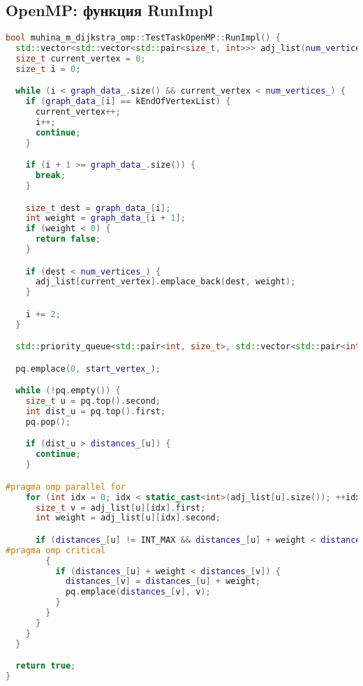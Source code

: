 \documentclass[12pt]{article}
\begin{document}
\subsection*{OpenMP: функция RunImpl}
\begin{lstlisting}[language=C++]
bool muhina_m_dijkstra_omp::TestTaskOpenMP::RunImpl() {
  std::vector<std::vector<std::pair<size_t, int>>> adj_list(num_vertices_);
  size_t current_vertex = 0;
  size_t i = 0;

  while (i < graph_data_.size() && current_vertex < num_vertices_) {
    if (graph_data_[i] == kEndOfVertexList) {
      current_vertex++;
      i++;
      continue;
    }

    if (i + 1 >= graph_data_.size()) {
      break;
    }

    size_t dest = graph_data_[i];
    int weight = graph_data_[i + 1];
    if (weight < 0) {
      return false;
    }

    if (dest < num_vertices_) {
      adj_list[current_vertex].emplace_back(dest, weight);
    }

    i += 2;
  }

  std::priority_queue<std::pair<int, size_t>, std::vector<std::pair<int, size_t>>, std::greater<>> pq;

  pq.emplace(0, start_vertex_);

  while (!pq.empty()) {
    size_t u = pq.top().second;
    int dist_u = pq.top().first;
    pq.pop();

    if (dist_u > distances_[u]) {
      continue;
    }

#pragma omp parallel for
    for (int idx = 0; idx < static_cast<int>(adj_list[u].size()); ++idx) {
      size_t v = adj_list[u][idx].first;
      int weight = adj_list[u][idx].second;

      if (distances_[u] != INT_MAX && distances_[u] + weight < distances_[v]) {
#pragma omp critical
        {
          if (distances_[u] + weight < distances_[v]) {
            distances_[v] = distances_[u] + weight;
            pq.emplace(distances_[v], v);
          }
        }
      }
    }
  }

  return true;
}
\end{lstlisting}
\end{document}
